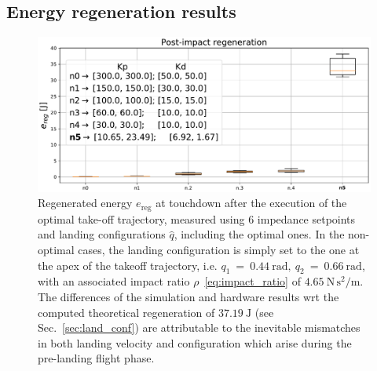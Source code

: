 \subsection{Energy regeneration results}
\begin{figure}[t]
    \centering
    \includegraphics[width=1\columnwidth]{images/opt_vs_non_opt_conf.pdf}
    \caption{Regenerated energy $e_{\mathrm{reg}}$ at touchdown after the execution of the optimal take-off trajectory, measured using 6 impedance setpoints and landing configurations $\hat{q}$, including the optimal ones. In the non-optimal cases, the landing configuration is simply set to the one at the apex of the takeoff trajectory, i.e. $q_1~=~0.44~\mathrm{rad},~q_2~=~0.66~\mathrm{rad}$, with an associated impact ratio $\rho$~\eqref{eq:impact_ratio} of $4.65~\mathrm{N\,s^2/m}$. 
   	The differences of the simulation and hardware results wrt the computed theoretical regeneration of $37.19~\mathrm{J}$ (see Sec.~\ref{sec:land_conf}) are attributable to the inevitable mismatches in both landing velocity and configuration which arise during the pre-landing flight phase.\vspace{-0.3cm}}
    \label{fig:energy_rec_comp}
\end{figure}
